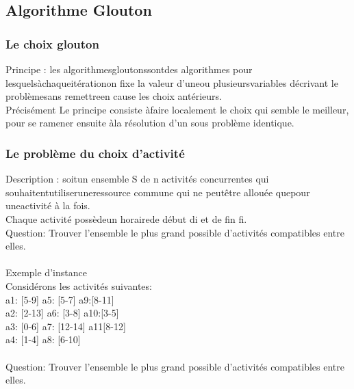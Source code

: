 \documentclass[5pt]{article}
\begin{document}
\begin{scriptsize}
\subsection{Algorithme Glouton}
\subsubsection{Le choix glouton }
Principe : les algorithmesgloutonssontdes algorithmes pour lesquelsàchaqueitérationon fixe la valeur d’uneou plusieursvariables décrivant le problèmesans remettreen cause les choix antérieurs.\\
Précisément Le principe consiste àfaire localement le choix qui semble le meilleur, pour se ramener ensuite àla résolution d’un sous problème identique.\\

\subsubsection{Le problème du choix d’activité}
Description : soitun ensemble S de n activités concurrentes qui souhaitentutiliseruneressource commune qui ne peutêtre allouée quepour uneactivité à la fois.\\
Chaque activité possèdeun horairede début di et de fin fi.\\
Question:  Trouver l’ensemble le plus grand possible d’activités compatibles entre elles.\\
\\
Exemple d’instance\\
Considérons les activités suivantes:\\
a1: [5-9]      a5: [5-7]      a9:[8-11]\\
a2: [2-13]     a6: [3-8]      a10:[3-5]\\
a3: [0-6]      a7: [12-14]    a11[8-12]\\
a4: [1-4]      a8: [6-10]\\
\\
Question:  Trouver l’ensemble le plus grand possible d’activités compatibles entre elles.\\


\end{scriptsize}
\end{document}
